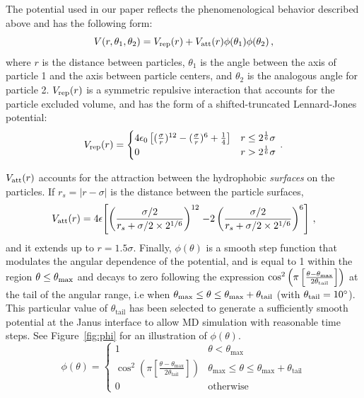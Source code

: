 The potential used in our paper reflects the phenomenological behavior described above and has the following form:
\begin{equation}
	V(r,\theta_1,\theta_2) = V_{\rm rep}(r) + V_{\rm att}(r)\phi(\theta_1)\phi(\theta_2)\,,
\end{equation}
where $r$ is the distance between particles, $\theta_1$ is the angle between the axis of particle 1 and the axis between particle centers, and $\theta_2$ is the analogous angle for particle 2.  
$V_{\rm rep}(r)$ is a symmetric repulsive interaction that accounts for the particle excluded volume, and has the form of a shifted-truncated  Lennard-Jones potential:
\begin{equation}
	V_{\rm rep}(r) = \begin{cases} 4\epsilon_0 \left[ (\frac{\sigma}{r})^{12} - (\frac{\sigma}{r})^{6} +\frac{1}{4}\right] & r \leq 2^{\frac{1}{6}}\sigma 
			\\ 0 & r > 2^{\frac{1}{6}}\sigma \end{cases}\,.
\end{equation}

$V_{\rm att}(r)$ accounts for the attraction between the hydrophobic \emph{surfaces} on the particles.
If $r_s = |r - \sigma |$ is the distance between the particle surfaces,
\begin{equation}
V_{\rm att}(r) = 4 \epsilon\Biggl[\left(\frac{\sigma/2}{r_s+\sigma/2\times2^{1/6}}\right)^{12}
\left.-2\left(\frac{\sigma/2}{r_s+\sigma/2\times2^{1/6}}\right)^6\right] \,,
\end{equation}
and it extends up to $r=1.5\sigma$. Finally,
$\phi\left(\theta\right)$ is a smooth step function that modulates the angular dependence of the potential, and 
is equal to 1 within the region $\theta \leq \theta_{\rm max}$ and decays  to 
zero following the expression $\cos^2\left(\pi\left[\frac{\theta-\theta_{\rm max}}{2\theta_{\rm tail}}\right]\right)$ at the tail
of the angular range, i.e when $\theta_{\rm max}\leq\theta\leq\theta_{\rm max}+\theta_{\textrm{tail}}$ 
(with $\theta_{\rm tail}=10^{\circ}$). This particular value of $\theta_{\textrm{tail}}$ has been selected to generate a sufficiently smooth potential at the Janus interface to allow MD simulation with reasonable time steps.
See Figure~\ref{fig:phi} for an illustration of $\phi\left(\theta\right)$.
\begin{equation}
	\phi\left(\theta\right) = \begin{cases} 
		1 & \theta < \theta_{\textrm{max}} \\ 
		\cos^2\left(\pi\left[\frac{\theta-\theta_{\textrm{max}}}{2\theta_{\textrm{tail}}}\right]\right) & \theta_{\textrm{max}} \leq \theta \leq \theta_{\textrm{max}}+\theta_{\textrm{tail}} \\ 
		0 & \textrm{otherwise} 
	\end{cases}
\end{equation}

